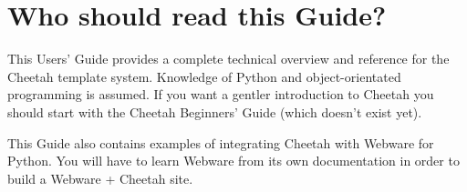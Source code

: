 \section{Who should read this Guide?}

This Users' Guide provides a complete technical overview and reference for the
Cheetah template system.  Knowledge of Python and object-orientated programming
is assumed.  If you want a gentler introduction to Cheetah you should start with
the Cheetah Beginners' Guide (which doesn't exist yet).

This Guide also contains examples of integrating Cheetah with Webware for
Python.  You will have to learn Webware from its own documentation in order to
build a Webware + Cheetah site.

